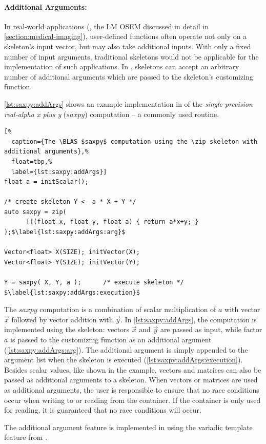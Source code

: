 \paragraph{Additional Arguments:}
In real-world applications (\eg, the LM OSEM discussed in detail in \autoref{section:medical-imaging}), user-defined functions often operate not only on a skeleton's input vector, but may also take additional inputs.
With only a fixed number of input arguments, traditional skeletons would not be applicable for the implementation of such applications.
In \SkelCL, skeletons can accept an arbitrary number of additional arguments which are passed to the skeleton's customizing function.

\autoref{lst:saxpy:addArgs} shows an example implementation in \SkelCL of the \emph{single-precision real-alpha x plus y} ($saxpy$) computation -- a commonly used \BLAS routine.
\begin{lstlisting}[%
  caption={The \BLAS $saxpy$ computation using the \zip skeleton with additional arguments},%
  float=tbp,%
  label={lst:saxpy:addArgs}]
float a = initScalar();

/* create skeleton Y <- a * X + Y */
auto saxpy = zip(
      [](float x, float y, float a) { return a*x+y; } );$\label{lst:saxpy:addArgs:arg}$

Vector<float> X(SIZE); initVector(X);
Vector<float> Y(SIZE); initVector(Y);

Y = saxpy( X, Y, a );      /* execute skeleton */ $\label{lst:saxpy:addArgs:execution}$
\end{lstlisting}
The $saxpy$ computation is a combination of scalar multiplication of $a$ with vector $\vec{x}$ followed by vector addition with $\vec{y}$.
In \autoref{lst:saxpy:addArgs}, the computation is implemented using the \zip skeleton:
vectors $\vec{x}$ and $\vec{y}$ are passed as input, while factor $a$ is passed to the customizing function as an additional argument (\autoref{lst:saxpy:addArgs:arg}).
The additional argument is simply appended to the argument list when the skeleton is executed (\autoref{lst:saxpy:addArgs:execution}).
Besides scalar values, like shown in the example, vectors and matrices can also be passed as additional arguments to a skeleton.
When vectors or matrices are used as additional arguments, the user is responsible to ensure that no race conditions occur when writing to or reading from the container.
If the container is only used for reading, it is guaranteed that no race conditions will occur.

The additional argument feature is implemented in \SkelCL using the variadic template feature from \Cpp.

